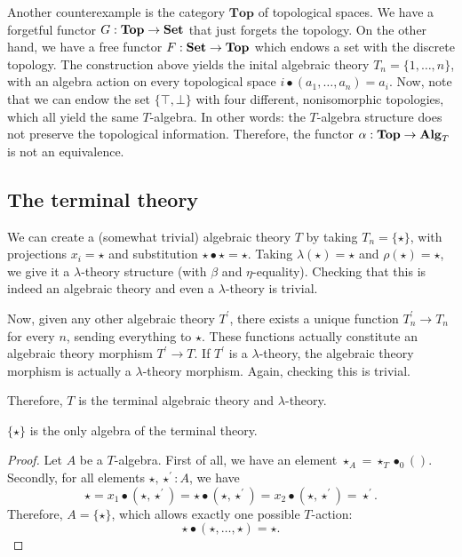 \begin{remark}
  Another counterexample is the category $ \mathbf{Top} $ of topological spaces. We have a forgetful functor $ G: \mathbf{Top} \to \mathbf{Set} $ that just forgets the topology. On the other hand, we have a free functor $ F: \mathbf{Set} \to \mathbf{Top} $ which endows a set with the discrete topology. The construction above yields the inital algebraic theory $ T_n = \{ 1, \dots, n \} $, with an algebra action on every topological space $ i \bullet (a_1, \dots, a_n) = a_i $. Now, note that we can endow the set $ \{ \top, \bot \} $ with four different, nonisomorphic topologies, which all yield the same $ T $-algebra. In other words: the $ T $-algebra structure does not preserve the topological information. Therefore, the functor $ \alpha: \mathbf{Top} \to \mathbf{Alg}_{T} $ is not an equivalence.
\end{remark}

\subsection{The terminal theory}
\begin{example}
  We can create a (somewhat trivial) algebraic theory $ T $ by taking $ T_n = \{ \star \} $, with projections $ x_i = \star $ and substitution $ \star \bullet \star = \star $. Taking $ \lambda(\star) = \star $ and $ \rho(\star) = \star $, we give it a $ \lambda $-theory structure (with $ \beta $ and $ \eta $-equality). Checking that this is indeed an algebraic theory and even a $ \lambda $-theory is trivial.

  Now, given any other algebraic theory $ T^\prime $, there exists a unique function $ T^\prime_n \to T_n $ for every $ n $, sending everything to $ \star $. These functions actually constitute an algebraic theory morphism $ T^\prime \to T $. If $ T^\prime $ is a $ \lambda $-theory, the algebraic theory morphism is actually a $ \lambda $-theory morphism. Again, checking this is trivial.

  Therefore, $ T $ is the terminal algebraic theory and $ \lambda $-theory.
\end{example}

\begin{lemma}
  $ \{ \star \} $ is the only algebra of the terminal theory.
\end{lemma}
\begin{proof}
  Let $ A $ be a $ T $-algebra. First of all, we have an element $ \star_A = \star_T \bullet_{0} () $. Secondly, for all elements $ \star, \star^\prime: A $, we have
  \[ \star = x_1 \bullet (\star, \star^\prime) = \star \bullet (\star, \star^\prime) = x_2 \bullet (\star, \star^\prime) = \star^\prime. \]
  Therefore, $ A = \{ \star \} $, which allows exactly one possible $ T $-action:
  \[ \star \bullet (\star, \dots, \star) = \star. \]
\end{proof}

